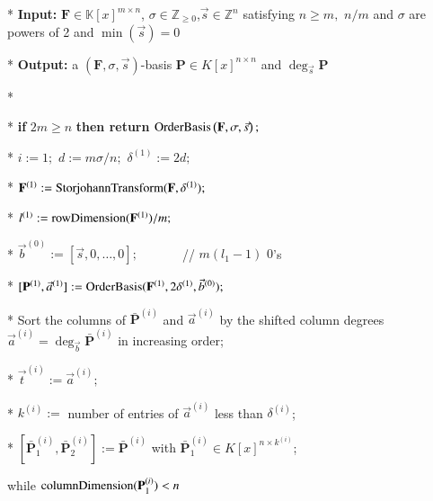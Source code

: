%
\begin{algorithm}[t]
\caption{$\mmab\left(\mathbf{F},\sigma,\vec{s}\right)$ }


\label{alg:mab} 
\begin{algor}
\item [{{*}}] \textbf{Input:} $\mathbf{F}\in\mathbb{K}\left[x\right]^{m\times n}$,
$\sigma\in\mathbb{Z}_{\ge0}$,$\vec{s}\in\mathbb{Z}^{n}$ satisfying
$n\ge m,$ $n/m$ and $\sigma$ are powers of 2 and $\min\left(\vec{s}\right)=0$ 
\item [{{*}}] \textbf{Output:} a $\left(\mathbf{F},\sigma,\vec{s}\right)$-basis
$\mathbf{P}\in K\left[x\right]^{n\times n}$ and $\deg_{\vec{s}}\mathbf{P}$
\item [{{*}}]~\end{algor}
\begin{algor}[1]
\item [{{*}}] \textbf{if }$2m\ge n$ \textbf{then return} $\mab\left(\mathbf{F},\sigma,\vec{s}\right);$ 
\item [{{{*}}}] $i:=1;$ $d:=m\sigma/n;$ $\delta^{\left(1\right)}:=2d;$ 
\item [{{{*}}}] $\bar{\mathbf{F}}^{\left(1\right)}:=\StorjohannTransform(\mathbf{F},\delta^{\left(1\right)});$ 
\item [{{{*}}}] $l^{\left(1\right)}:=\rowDimension(\bar{\mathbf{F}}^{\left(1\right)})/m;$ 
\item [{{{*}}}] $\vec{b}^{\left(0\right)}:=\left[\vec{s},0,\dots,0\right];$\ \ \ \ \ \ \ //
$m(l_{1}-1)$ $0$'s
\item [{{{*}}}] $[\bar{\mathbf{P}}^{\left(1\right)},\vec{a}^{\left(1\right)}]:=\mab(\bar{\mathbf{F}}^{\left(1\right)},2\delta^{\left(1\right)},\vec{b}^{\left(0\right)});$ 
\item [{{{*}}}] Sort the columns of $\bar{\mathbf{P}}^{\left(i\right)}$
and $\vec{a}^{\left(i\right)}$ by the shifted column degrees $\vec{a}^{\left(i\right)}=\deg_{\vec{b}}\bar{\mathbf{P}}^{\left(i\right)}$
in increasing order; 
\item [{{*}}] $\vec{t}^{\left(i\right)}:=\vec{a}^{\left(i\right)};$ 
\item [{{{*}}}] $k^{\left(i\right)}:=$ number of entries of $\vec{a}^{\left(i\right)}$
less than $\delta^{\left(i\right)}$;
\item [{{*}}] $[\bar{\mathbf{P}}_{1}^{\left(i\right)},\bar{\mathbf{P}}_{2}^{\left(i\right)}]:=\bar{\mathbf{P}}^{\left(i\right)}$
with $\bar{\mathbf{P}}_{1}^{\left(i\right)}\in K\left[x\right]^{n\times k^{\left(i\right)}}$;
\item [{{while}}] $\columnDimension(\bar{\mathbf{P}}_{1}^{\left(i\right)})<n$ 

\end{algor}
\end{algorithm}
